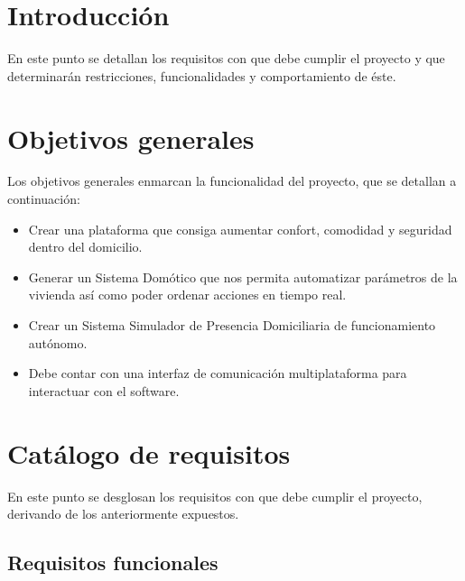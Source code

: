 \section{Introducción}
En este punto se detallan los requisitos con que debe cumplir el proyecto y que determinarán restricciones, funcionalidades y comportamiento de éste. 

\section{Objetivos generales}
Los objetivos generales enmarcan la funcionalidad del proyecto, que se detallan a continuación:
\begin{itemize}
    \item Crear una plataforma que consiga aumentar confort, comodidad y seguridad dentro del domicilio.
    \item Generar un Sistema Domótico que nos permita automatizar parámetros de la vivienda así como poder ordenar acciones en tiempo real.
    \item Crear un Sistema Simulador de Presencia Domiciliaria de funcionamiento autónomo.
    \item Debe contar con una interfaz de comunicación multiplataforma para interactuar con el software.
\end{itemize}

\section{Catálogo de requisitos}
En este punto se desglosan los requisitos con que debe cumplir el proyecto, derivando de los anteriormente expuestos.

\subsection{\textbf{Requisitos funcionales}}

